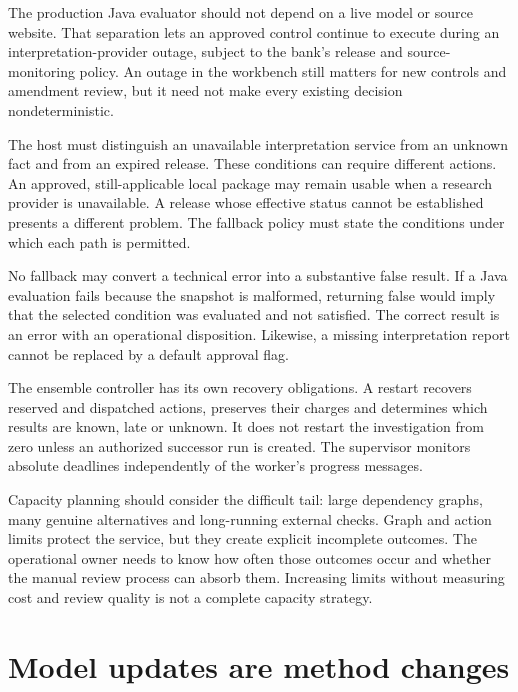 The production Java evaluator should not depend on a live model or source website.
That separation lets an approved control continue to execute during an
interpretation-provider outage, subject to the bank's release and source-monitoring
policy. An outage in the workbench still matters for new controls and amendment
review, but it need not make every existing decision nondeterministic.

The host must distinguish an unavailable interpretation service from an unknown
fact and from an expired release. These conditions can require different actions.
An approved, still-applicable local package may remain usable when a research
provider is unavailable. A release whose effective status cannot be established
presents a different problem. The fallback policy must state the conditions under
which each path is permitted.


No fallback may convert a technical error into a substantive false result. If a
Java evaluation fails because the snapshot is malformed, returning false would
imply that the selected condition was evaluated and not satisfied. The correct
result is an error with an operational disposition. Likewise, a missing
interpretation report cannot be replaced by a default approval flag.

The ensemble controller has its own recovery obligations. A restart recovers
reserved and dispatched actions, preserves their charges and determines which
results are known, late or unknown. It does not restart the investigation from
zero unless an authorized successor run is created. The supervisor monitors
absolute deadlines independently of the worker's progress messages.

Capacity planning should consider the difficult tail: large dependency graphs,
many genuine alternatives and long-running external checks. Graph and action
limits protect the service, but they create explicit incomplete outcomes. The
operational owner needs to know how often those outcomes occur and whether the
manual review process can absorb them. Increasing limits without measuring cost
and review quality is not a complete capacity strategy.

\section{Model updates are method changes}
\label{merge:M10:10}


